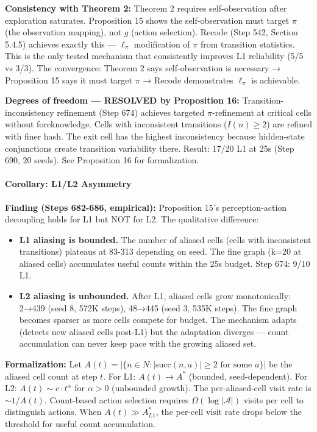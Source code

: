 \documentclass[
  11pt,
]{article}
\providecommand{\tightlist}{%
  \setlength{\itemsep}{0pt}\setlength{\parskip}{0pt}}
\begin{document}
\textbf{Consistency with Theorem 2:} Theorem 2 requires self-observation
after exploration saturates. Proposition 15 shows the self-observation
must target \(\pi\) (the observation mapping), not \(g\) (action
selection). Recode (Step 542, Section 5.4.5) achieves exactly this ---
\(\ell_\pi\) modification of \(\pi\) from transition statistics. This is
the only tested mechanism that consistently improves L1 reliability (5/5
vs 3/3). The convergence: Theorem 2 says self-observation is necessary →
Proposition 15 says it must target \(\pi\) → Recode demonstrates
\(\ell_\pi\) is achievable.

\textbf{Degrees of freedom --- RESOLVED by Proposition 16:}
Transition-inconsistency refinement (Step 674) achieves targeted
\(\pi\)-refinement at critical cells without foreknowledge. Cells with
inconsistent transitions (\(I(n) \geq 2\)) are refined with finer hash.
The exit cell has the highest inconsistency because hidden-state
conjunctions create transition variability there. Result: 17/20 L1 at
25s (Step 690, 20 seeds). See Proposition 16 for formalization.

\paragraph{Corollary: L1/L2 Asymmetry}\label{corollary-l1l2-asymmetry}

\textbf{Finding (Steps 682-686, empirical):} Proposition 15's
perception-action decoupling holds for L1 but NOT for L2. The
qualitative difference:

\begin{itemize}
\tightlist
\item
  \textbf{L1 aliasing is bounded.} The number of aliased cells (cells
  with inconsistent transitions) plateaus at 83-313 depending on seed.
  The fine graph (k=20 at aliased cells) accumulates useful counts
  within the 25s budget. Step 674: 9/10 L1.
\item
  \textbf{L2 aliasing is unbounded.} After L1, aliased cells grow
  monotonically: 2→439 (seed 8, 572K steps), 48→445 (seed 3, 535K
  steps). The fine graph becomes sparser as more cells compete for
  budget. The mechanism adapts (detects new aliased cells post-L1) but
  the adaptation diverges --- count accumulation can never keep pace
  with the growing aliased set.
\end{itemize}

\textbf{Formalization:} Let
\(A(t) = |\{n \in N : |\text{succ}(n, a)| \geq 2 \text{ for some } a\}|\)
be the aliased cell count at step \(t\). For L1: \(A(t) \to A^*\)
(bounded, seed-dependent). For L2: \(A(t) \sim c \cdot t^\alpha\) for
\(\alpha > 0\) (unbounded growth). The per-aliased-cell visit rate is
\(\sim 1/A(t)\). Count-based action selection requires
\(\Omega(\log |\mathcal{A}|)\) visits per cell to distinguish actions.
When \(A(t) \gg A^*_{L1}\), the per-cell visit rate drops below the
threshold for useful count accumulation.
\end{document}
